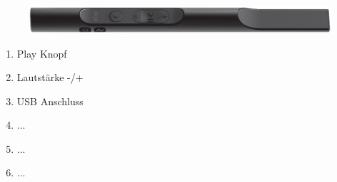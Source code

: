 \begin{figure}[h]
	\centering
	\includegraphics[width=\textwidth]{graphics/DojoBild.png}
\end{figure}
\begin{center}
\parbox{50mm}{
\begin{enumerate}
	\item Play Knopf
    \item Lautstärke -/+
    \item USB Anschluss
    \item ...
    \item ...
    \item ...
\end{enumerate}}
\end{center}